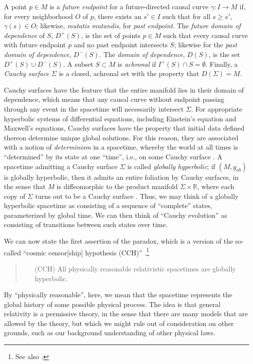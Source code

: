 \documentclass[authoryear,12pt,3p]{jowarticle}
\begin{document}
A point $p\in M$ is a \emph{future endpoint} for a future-directed causal curve $\gamma:I\rightarrow M$ if, for every neighborhood $O$ of $p$, there exists an $s'\in I$ such that for all $s\geq s'$, $\gamma(s)\in O$; likewise, \emph{mutatis mutandis}, for \emph{past endpoint}. The \emph{future domain of dependence} of $S$, $D^+(S)$, is the set of points $p\in M$ such that every causal curve with future endpoint $p$ and no past endpoint intersects $S$; likewise for the \emph{past domain of dependence}, $D^-(S)$.  The \emph{domain of dependence}, $D(S)$, is the set $D^+(S)\cup D^-(S)$. A subset $S\subset M$ is \emph{achronal} if $I^+(S)\cap S=\emptyset$.  Finally, a \emph{Cauchy surface} $\Sigma$ is a closed, achronal set with the property that $D(\Sigma)=M$.

Cauchy surfaces have the feature that the entire manifold lies in their domain of dependence, which means that any causal curve without endpoint passing through any event in the spacetime will necessarily intersect $\Sigma$.  For appropriate hyperbolic systems of differential equations, including Einstein's equation and Maxwell's equations, Cauchy surfaces have the property that initial data defined thereon determine unique global solutions.  For this reason, they are associated with a notion of \emph{determinism} in a spacetime, whereby the world at all times is ``determined'' by its state at one ``time'', i.e., on some Cauchy surface \citep{EarmanPD}.  A spacetime admitting a Cauchy surface $\Sigma$ is called \emph{globally hyperbolic}; if $(M,g_{ab})$ is globally hyperbolic, then it admits an entire foliation by Cauchy surfaces, in the sense that $M$ is diffeomorphic to the product manifold $\Sigma\times \mathbb{R}$, where each copy of $\Sigma$ turns out to be a Cauchy surface \citep{GerochSplitting,Bernal+Sanchez}.  Thus, we may think of a globally hyperbolic spacetime as consisting of a sequence of ``complete'' states, parameterized by global time.  We can then think of ``Cauchy evolution'' as consisting of transitions between such states over time.

We can now state the first assertion of the paradox, which is a version of the so-called ``cosmic censor[ship] hypothesis (CCH)'' \citep[p. 204]{Wald}.\footnote{See also \citet{Penrose}.}
\begin{quote}
\begin{itemize}
\item[(CCH)]\label{CCH} All physically reasonable relativistic spacetimes are globally hyperbolic.
\end{itemize}
\end{quote}
By ``physically reasonable'', here, we mean that the spacetime represents the global history of some possible physical process.  The idea is that general relativity is a permissive theory, in the sense that there are many models that are allowed by the theory, but which we might rule out of consideration on other grounds, such as our background understanding of other physical laws.
\end{document}

